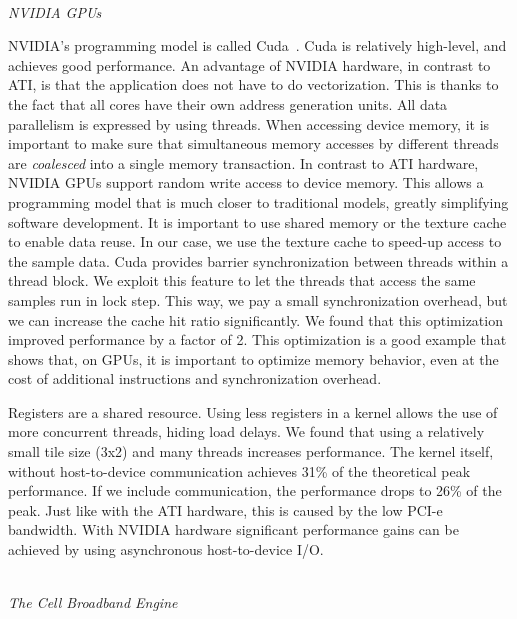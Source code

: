 \documentclass{article}
\newcommand{\longversion}[1]{}
\begin{document}
\noindent \\ \emph{NVIDIA GPUs}

\noindent NVIDIA's programming model is called Cuda~\cite{cuda-manual}.
Cuda is relatively high-level, and achieves good performance.
An advantage of NVIDIA hardware, in contrast to ATI, is that the application does not have to do 
vectorization. This is thanks to the fact that all cores have their own address generation units. 
All data parallelism is expressed by using threads.
When accessing device memory, it is important to make sure that
simultaneous memory accesses by different threads are \emph{coalesced}
into a single memory transaction.  In contrast to ATI hardware, NVIDIA
GPUs support random write access to device memory. This allows a
programming model that is much closer to traditional models, greatly
simplifying software development.
It is important to use shared memory or the texture cache to enable data reuse.
In our case, we use the texture cache to speed-up access to the sample data. 
Cuda provides barrier synchronization between threads within a thread block.
We exploit this feature to let
the threads that access the same samples run in lock step.  This way,
we pay a small synchronization overhead, but we can increase the cache hit
ratio significantly.  We found that this optimization improved performance by a factor of 2.
This optimization is a good example that shows that, on GPUs, it is important to optimize
memory behavior, even at the cost of additional instructions and synchronization overhead.

\longversion{
We also investigated the use of the per-multiprocessor shared memory as an
application-managed cache.  Others report good results with this
approach~\cite{gpu-cache}.  However, we found that, for our
application, the use of shared memory only led to performance
degradation.
}

Registers are a shared resource. Using less registers in a kernel
allows the use of more concurrent threads, hiding load delays.
We found that using a relatively small tile size (3x2) and many threads increases performance.
The kernel itself, without host-to-device communication achieves 31\%
of the theoretical peak performance.  If we include communication, the
performance drops to 26\% of the peak. Just like with the ATI
hardware, this is caused by the low PCI-e bandwidth.  With NVIDIA
hardware significant performance gains can be achieved by using asynchronous host-to-device I/O.


\noindent \\ \emph{The Cell Broadband Engine}
\end{document}
